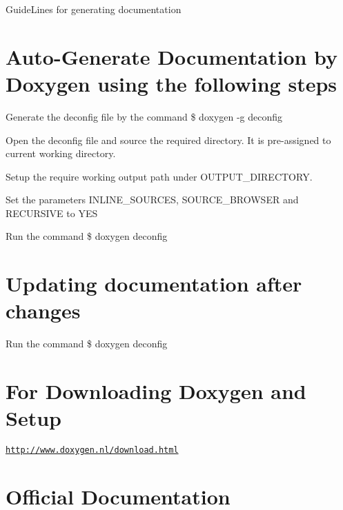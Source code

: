 Guide\+Lines for generating documentation\hypertarget{md_docs_readme_autotoc_md26}{}\section{Auto-\/\+Generate Documentation by Doxygen using the following steps}\label{md_docs_readme_autotoc_md26}

\begin{DoxyEnumerate}
\item Generate the deconfig file by the command \$ doxygen -\/g deconfig
\item Open the deconfig file and source the required directory. It is pre-\/assigned to current working directory.
\item Setup the require working output path under O\+U\+T\+P\+U\+T\+\_\+\+D\+I\+R\+E\+C\+T\+O\+RY.
\item Set the parameters I\+N\+L\+I\+N\+E\+\_\+\+S\+O\+U\+R\+C\+ES, S\+O\+U\+R\+C\+E\+\_\+\+B\+R\+O\+W\+S\+ER and R\+E\+C\+U\+R\+S\+I\+VE to Y\+ES
\item Run the command \$ doxygen deconfig
\end{DoxyEnumerate}\hypertarget{md_docs_readme_autotoc_md27}{}\section{Updating documentation after changes}\label{md_docs_readme_autotoc_md27}

\begin{DoxyEnumerate}
\item Run the command \$ doxygen deconfig
\end{DoxyEnumerate}\hypertarget{md_docs_readme_autotoc_md28}{}\section{For Downloading Doxygen and Setup}\label{md_docs_readme_autotoc_md28}
\href{http://www.doxygen.nl/download.html}{\tt http\+://www.\+doxygen.\+nl/download.\+html}\hypertarget{md_docs_readme_autotoc_md29}{}\section{Official Documentation}\label{md_docs_readme_autotoc_md29}
